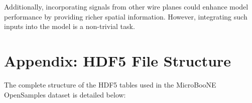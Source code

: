 \documentclass{pracalicmgr}
\begin{document}
Additionally, incorporating signals from other wire planes could enhance model performance by providing richer spatial information. However, integrating such inputs into the model is a non-trivial task.

\newpage

\listoffigures
\newpage

\listoftables
\newpage



\newpage

\appendix

\section*{Appendix: HDF5 File Structure}
\label{app:hdf5_structure}

The complete structure of the HDF5 tables used in the MicroBooNE OpenSamples dataset is detailed below:
\end{document}
